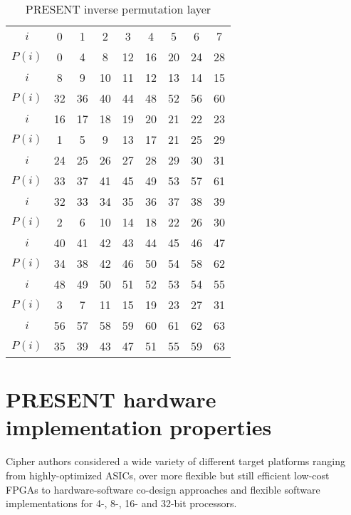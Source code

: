 \begin{table}[p]
    \centering
    \caption{PRESENT inverse permutation layer}
    \label{tbl:invplayer}
    \small
    \begin{tabular}{|c||c|c|c|c|c|c|c|c|}
        \hline
        $ i $  & 0 & 1 & 2 & 3  & 4  & 5  & 6  & 7  \\[-0.8ex]
        $P(i)$ & 0 & 4 & 8 & 12 & 16 & 20 & 24 & 28 \\
        \hline
        $ i $  & 8  & 9  & 10 & 11 & 12 & 13 & 14 & 15 \\[-0.8ex]  
        $P(i)$ & 32 & 36 & 40 & 44 & 48 & 52 & 56 & 60 \\        
        \hline
        $ i $  & 16 & 17 & 18 & 19 & 20 & 21 & 22 & 23 \\[-0.8ex]
        $P(i)$ & 1  & 5  & 9  & 13 & 17 & 21 & 25 & 29 \\
        \hline
        $ i $  & 24 & 25 & 26 & 27 & 28 & 29 & 30 & 31 \\[-0.8ex] 
        $P(i)$ & 33 & 37 & 41 & 45 & 49 & 53 & 57 & 61 \\       
        \hline
        $ i $  & 32 & 33 & 34 & 35 & 36 & 37 & 38 & 39 \\[-0.8ex]
        $P(i)$ & 2  & 6  & 10 & 14 & 18 & 22 & 26 & 30 \\
        \hline
        $ i $  & 40 & 41 & 42 & 43 & 44 & 45 & 46 & 47 \\[-0.8ex] 
        $P(i)$ & 34 & 38 & 42 & 46 & 50 & 54 & 58 & 62 \\       
        \hline
        $ i $  & 48 & 49 & 50 & 51 & 52 & 53 & 54 & 55 \\[-0.8ex]
        $P(i)$ & 3  & 7  & 11 & 15 & 19 & 23 & 27 & 31 \\
        \hline
        $ i $  & 56 & 57 & 58 & 59 & 60 & 61 & 62 & 63 \\[-0.8ex] 
        $P(i)$ & 35 & 39 & 43 & 47 & 51 & 55 & 59 & 63 \\               
        \hline
    \end{tabular}
\end{table}

\section{PRESENT hardware implementation properties}

Cipher authors considered a wide variety of different target platforms ranging
from highly-optimized ASICs, over more flexible but still efficient low-cost
FPGAs to hardware-software co-design approaches and flexible software
implementations for 4-, 8-, 16- and 32-bit processors.

